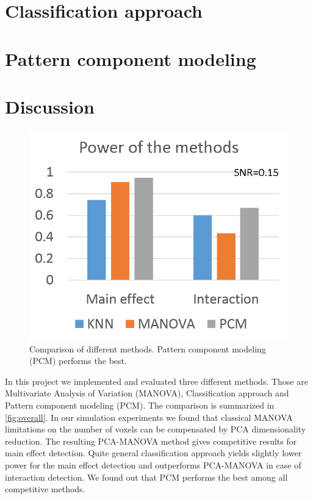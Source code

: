 \documentclass[paper=a4,fontsize=12pt]{scrartcl}
\numberwithin{equation}{section} %
\numberwithin{figure}{section} %
\numberwithin{table}{section} %
\begin{document}


\FloatBarrier

\section{Classification approach}\label{sec:classification}



\section{Pattern component modeling}\label{sec:pcm}

\section{Discussion}

\begin{figure}[t]
\centering
\includegraphics{overall.png}
\caption{Comparison of different methods. Pattern component modeling (PCM) performs the best.}
\label{fig:overall}
\end{figure}

In this project we implemented and evaluated three different methods. Those are Multivariate Analysis of Variation (MANOVA), Classification approach and Pattern component modeling (PCM). The comparison is summarized in \autoref{fig:overall}. In our simulation experiments we found that classical MANOVA limitations on the number of voxels can be compensated by PCA dimensionality reduction. The resulting PCA-MANOVA method gives competitive results for main effect detection. Quite general classification approach yields slightly lower power for the main effect detection and outperforms PCA-MANOVA in case of interaction detection. We found out that PCM performs the best among all competitive methods.
\end{document}
